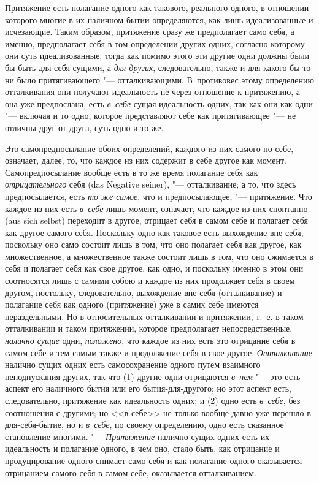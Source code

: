 Притяжение есть полагание одного как такового, реального одного, в отношении
которого многие в их наличном бытии определяются, как лишь идеализованные и
исчезающие. Таким образом, притяжение сразу же предполагает само себя, а
именно, предполагает себя в том определении других одних, согласно которому
они суть идеализованные, тогда как помимо этого эти другие одни должны были
бы быть для-себя-сущими, а {\em для других},
следовательно, также и для какого бы то ни было притягивающего
"--- отталкивающими. В~противовес этому определению отталкивания они получают
идеальность не через отношение к притяжению, а она уже предпослана, есть
{\em в~себе} сущая идеальность одних, так как они как одни "--- включая
и то одно, которое представляют себе как притягивающее "--- не
отличны друг от друга, суть одно и то же.

Это самопредпосылание обоих определений, каждого из них самого по себе,
означает, далее, то, что каждое из них содержит в себе другое как момент.
Самопредпосылание вообще есть в то же время полагание себя как
{\em отрицательного} себя (das Negative seiner), "---
отталкивание; а то, что здесь предпосылается, есть
{\em то же самое}, что и предпосылающее, "--- притяжение.
Что каждое из них есть {\em в~себе} лишь момент,
означает, что каждое из них спонтанно (aus sich selbst) переходит в
другое, отрицает себя в самом себе и полагает себя как другое самого себя.
Поскольку одно как таковое есть выхождение вне себя, поскольку оно само
состоит лишь в том, что оно полагает себя как другое, как множественное, а
множественное также состоит лишь в том, что оно сжимается в себя и полагает
себя как свое другое, как одно, и поскольку именно в этом они соотносятся
лишь с самими собою и каждое из них продолжает себя в своем другом,
постольку, следовательно, выхождение вне себя (отталкивание) и полагание
себя как одного (притяжение) уже в самих себе имеются нераздельными. Но в
относительных отталкивании и притяжении, т.~е. в таком отталкивании и таком
притяжении, которое предполагает непосредственные, {\em налично сущие} одни,
{\em положено}, что каждое из них есть это отрицание
себя в самом себе и тем самым также и продолжение себя в свое другое.
{\em Отталкивание} налично сущих одних есть
самосохранение одного путем взаимного неподпускания других, так что (1)
другие одни отрицаются {\em в~нем} "--- это есть аспект
его наличного бытия или его бытия-для-другого; но этот аспект есть,
следовательно, притяжение как идеальность одних; и (2) одно есть
{\em в~себе}, без соотношения с другими; но <<в себе>> не
только вообще давно уже перешло в для-себя-бытие, но и
{\em в~себе}, по своему определению, одно есть
сказанное становление многими. "--- {\em Притяжение}
налично сущих одних есть их идеальность и полагание одного, в чем оно,
стало быть, как отрицание и продуцирование одного снимает само себя и как
полагание одного оказывается отрицанием самого себя в самом себе,
оказывается отталкиванием.

